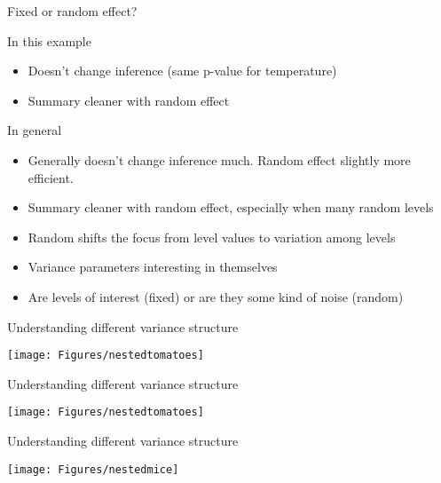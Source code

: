 \documentclass{beamer}
\begin{document}
\begin{frame}{Fixed or random effect?}
  \begin{block}{In this example}
   \begin{itemize}
    \item Doesn't change inference (same p-value for temperature)
    \item Summary cleaner with random effect
   \end{itemize}
  \end{block}

  \pause
  
  \begin{block}{In general}
   \begin{itemize}
    \item Generally doesn't change inference much. Random effect slightly more efficient.
    \item Summary cleaner with random effect, especially when many random levels
    \item Random shifts the focus from level values to variation among levels
    \item Variance parameters interesting in themselves
    \item Are levels of interest (fixed) or are they some kind of noise (random)
   \end{itemize}
  \end{block}

\end{frame}

\begin{frame}{Understanding different variance structure}
 
 \begin{center}
  \texttt{[image: Figures/nestedtomatoes]}
 \end{center}

\end{frame}

\begin{frame}{Understanding different variance structure}
 
 \begin{center}
  \texttt{[image: Figures/nestedtomatoes]}
 \end{center}

\end{frame}


\begin{frame}{Understanding different variance structure}
 
 \begin{center}
  \texttt{[image: Figures/nestedmice]}
 \end{center}

\end{frame}
\end{document}
